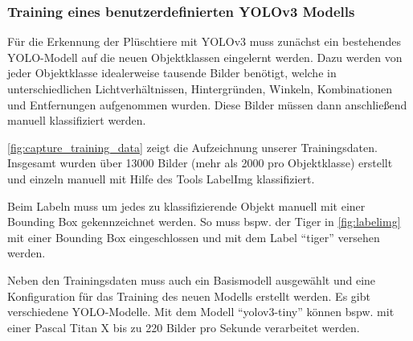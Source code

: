 \subsubsection{Training eines benutzerdefinierten YOLOv3 Modells}

Für die Erkennung der Plüschtiere mit \ac{YOLO}v3 muss zunächst ein bestehendes \ac{YOLO}-Modell auf die neuen Objektklassen eingelernt werden.
Dazu werden von jeder Objektklasse idealerweise tausende Bilder benötigt, welche in unterschiedlichen Lichtverhältnissen, Hintergründen, Winkeln, Kombinationen und Entfernungen aufgenommen wurden.
Diese Bilder müssen dann anschließend manuell klassifiziert werden.


\autoref{fig:capture_training_data} zeigt die Aufzeichnung unserer Trainingsdaten.
Insgesamt wurden über 13000 Bilder (mehr als 2000 pro Objektklasse) erstellt und einzeln manuell mit Hilfe des Tools LabelImg klassifiziert.


Beim Labeln muss um jedes zu klassifizierende Objekt manuell mit einer Bounding Box gekennzeichnet werden.
So muss bspw. der Tiger in \autoref{fig:labelimg} mit einer Bounding Box eingeschlossen und mit dem Label \enquote{tiger} versehen werden.

Neben den Trainingsdaten muss auch ein Basismodell ausgewählt und eine Konfiguration für das Training des neuen Modells erstellt werden.
Es gibt verschiedene \ac{YOLO}-Modelle.
Mit dem Modell \enquote{yolov3-tiny} können bspw. mit einer Pascal Titan X bis zu 220 Bilder pro Sekunde verarbeitet werden.

